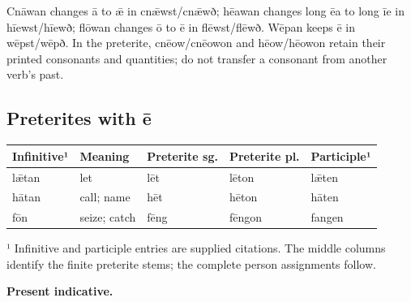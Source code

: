 Cnāwan changes ā to ǣ in cnǣwst/\allowbreak{}cnǣwð; hēawan changes long ēa to long īe in hīewst/\allowbreak{}hīewð; flōwan changes ō to ē in flēwst/\allowbreak{}flēwð. Wēpan keeps ē in wēpst/\allowbreak{}wēpð. In the preterite, cnēow/\allowbreak{}cnēowon and hēow/\allowbreak{}hēowon retain their printed consonants and quantities; do not transfer a consonant from another verb’s past.

\subsection*{Preterites with ē}

\par\begingroup
\fontsize{10.5}{13.2}\selectfont
\setlength{\LTleft}{0pt}\setlength{\LTright}{\fill}
\noindent
\begin{tabular}{@{}>{\raggedright\arraybackslash}p{23.14mm}>{\raggedright\arraybackslash}p{21.04mm}>{\raggedright\arraybackslash}p{22.72mm}>{\raggedright\arraybackslash}p{22.72mm}>{\raggedright\arraybackslash}p{23.14mm}@{}}
\toprule
\textbf{Infinitive¹} & \textbf{Meaning} & \textbf{Preterite sg.} & \textbf{Preterite pl.} & \textbf{Participle¹} \\
\midrule
lǣtan & let & lēt & lēton & lǣten \\
hātan & call; name & hēt & hēton & hāten \\
fōn & seize; catch & fēng & fēngon & fangen \\
\bottomrule
\end{tabular}
\par\endgroup

¹ Infinitive and participle entries are supplied citations. The middle columns identify the finite preterite stems; the complete person assignments follow.

\textbf{Present indicative.}

